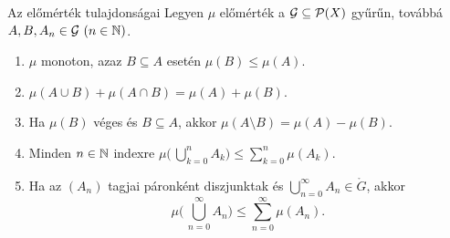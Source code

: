 \documentclass[
]{elteikthesis}[2024/04/26]
\begin{document}
	\newpage
	
	\begin{theorem}{Az előmérték tulajdonságai}{}
		Legyen \( \mu \) előmérték a \( \mathcal{G} \subseteq \mathcal{P}( X ) \) gyűrűn,
		továbbá \( A, B, A_n \in \mathcal{G} \ (n \in \mathbb{N}) \).
		
		\begin{enumerate}
			\item\label{th:előmérték-monoton}
			\( \mu \) monoton, azaz \( B \subseteq A \) esetén \( \mu(B) \leq \mu(A) \).
			
			\item\label{th:előmérték-szita-formula}
			\( \mu(A \cup B) + \mu(A \cap B) = \mu(A) + \mu(B) \).
			
			\item\label{th:előmérték-különbség-mértéke}
			Ha \( \mu(B) \) véges és \( B \subseteq A \),
			akkor \( \mu(A \setminus B) = \mu(A) - \mu(B) \).
			
			\item\label{th:előmérték-véges-szubadditív}
			Minden \( n \in \mathbb{N} \) indexre 
			\( \mu \biggl(\, \bigcup\limits_{k=0}^n \! A_k \biggr) \leq \sum\limits_{k=0}^n \mu( A_k ) \).
			
			\item\label{th:előmérték-szubadditívitás-kiterjesztése}
			Ha az \( (A_n) \) tagjai páronként diszjunktak
			és \( \bigcup\limits_{n=0}^{\infty} \! A_n \in \ring{G} \), akkor
			\[
			\mu \Biggl(\, \bigcup\limits_{n=0}^{\infty} \! A_n \Biggr) \leq 
			\sum\limits_{n=0}^{\infty} \mu( A_n ).
			\]
		\end{enumerate}
	\end{theorem}
\end{document}
